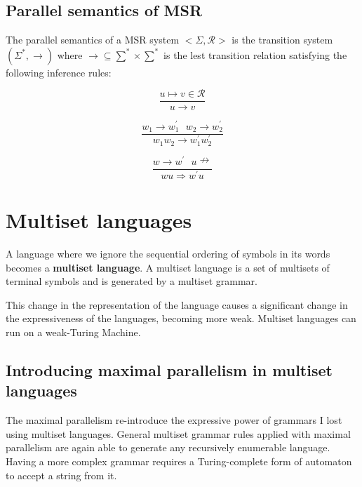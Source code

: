 \subsection{Parallel semantics of MSR}
The parallel semantics of a MSR system $<\Sigma, \mathcal{R}>$ is the transition system $(\Sigma^{*}, \rightarrow)$ where $\rightarrow \subseteq \sum^{*} \times \sum^{*}$ is the lest transition relation satisfying the following inference rules:

\begin{equation*}
    \frac{u \mapsto v \in \mathcal{R}}{u \rightarrow v}
\end{equation*}

\begin{equation*}
    \frac{w_{1} \rightarrow w^{'}_{1} \ \ \ w_{2} \rightarrow w^{'}_{2}}{w_{1}w_{2} \rightarrow w^{'}_{1}w^{'}_{2}} 
\end{equation*}

\begin{equation*}
    \frac{w \rightarrow w^{'} \ \ \ u \nrightarrow}{wu \Rightarrow w^{'}{u}} 
\end{equation*}

\section{Multiset languages}
A language where we ignore the sequential ordering of symbols in its words becomes a \textbf{multiset language}. A multiset language is a set of multisets of terminal symbols and is generated by a multiset grammar.\par
This change in the representation of the language causes a significant change in the expressiveness of the languages, becoming more weak. Multiset languages can run on a weak-Turing Machine.

\subsection{Introducing maximal parallelism in multiset languages}
The maximal parallelism re-introduce the expressive power of grammars I lost using multiset languages. General multiset grammar rules applied with maximal parallelism are again able to generate any recursively enumerable language. Having a more complex grammar requires a Turing-complete form of automaton to accept a string from it.

